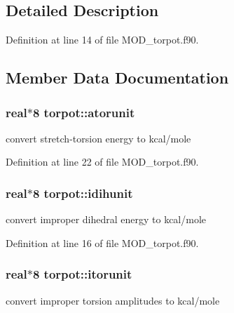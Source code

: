 \subsection{Detailed Description}


Definition at line 14 of file M\-O\-D\-\_\-torpot.\-f90.



\subsection{Member Data Documentation}
\hypertarget{classtorpot_ae5574ae24c2253ced1bf6062f26323ac}{
\subsubsection[{atorunit}]{\setlength{\rightskip}{0pt plus 5cm}real$\ast$8 torpot\-::atorunit}}\label{classtorpot_ae5574ae24c2253ced1bf6062f26323ac}


convert stretch-\/torsion energy to kcal/mole 



Definition at line 22 of file M\-O\-D\-\_\-torpot.\-f90.

\hypertarget{classtorpot_a82b672d0c03ddf1938511751d7640693}{
\subsubsection[{idihunit}]{\setlength{\rightskip}{0pt plus 5cm}real$\ast$8 torpot\-::idihunit}}\label{classtorpot_a82b672d0c03ddf1938511751d7640693}


convert improper dihedral energy to kcal/mole 



Definition at line 16 of file M\-O\-D\-\_\-torpot.\-f90.

\hypertarget{classtorpot_a4efda8e1fc851f01a1263a24075aa212}{
\subsubsection[{itorunit}]{\setlength{\rightskip}{0pt plus 5cm}real$\ast$8 torpot\-::itorunit}}\label{classtorpot_a4efda8e1fc851f01a1263a24075aa212}


convert improper torsion amplitudes to kcal/mole 



